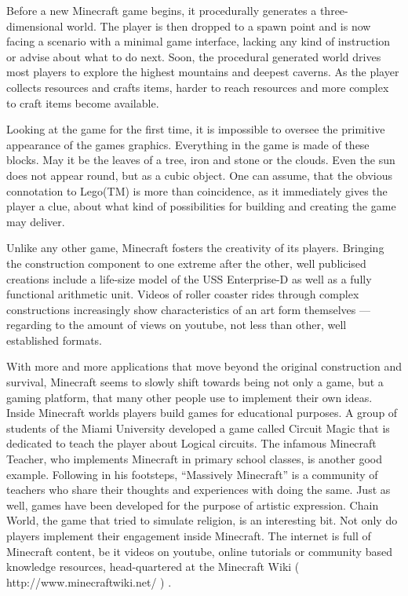 Before a new Minecraft game begins, it procedurally generates a three-dimensional world. The player is then dropped to a spawn point and is now facing a scenario with a minimal game interface, lacking any kind of instruction or advise about what to do next. Soon, the procedural generated world drives most players to explore the highest mountains and deepest caverns. As the player collects resources and crafts items, harder to reach resources and more complex to craft items  become available.~\cite{Duncan:2011:MBC:2207096.2207097}

Looking at the game for the first time, it is impossible to oversee the primitive appearance of the games graphics. Everything in the game is made of these blocks. May it be the leaves of a tree, iron and stone or the clouds. Even the sun does not appear round, but as a cubic object. One can assume, that the obvious connotation to Lego(TM) is more than coincidence, as it immediately gives the player a clue, about what kind of possibilities for building and creating the game may deliver.~\cite{Duncan:2011:MBC:2207096.2207097}

Unlike any other game, Minecraft fosters the creativity of its players. Bringing the construction component to one extreme after the other, well publicised creations include a life-size model of the USS Enterprise-D as well as a fully functional arithmetic unit. Videos of roller coaster rides through complex constructions increasingly show characteristics of an art form themselves --- regarding to the amount of views on youtube, not less than other, well established formats.~\cite{Duncan:2011:MBC:2207096.2207097}

With more and more applications that move beyond the original construction and survival, Minecraft seems to slowly shift towards being not only a game, but a gaming platform, that many other people use to implement their own ideas. Inside Minecraft worlds players build games for educational purposes. A group of students of the Miami University developed a game called Circuit Magic that is dedicated to teach the player about Logical circuits. The infamous Minecraft Teacher, who implements Minecraft in primary school classes, is another good example. Following in his footsteps, ``Massively Minecraft'' is a community of teachers who share their thoughts and experiences with doing the same. Just as well, games have been developed for the purpose of artistic expression. Chain World, the game that tried to simulate religion, is an interesting bit. Not only do players implement their engagement inside Minecraft. The internet is full of Minecraft content, be it videos on youtube, online tutorials or community based knowledge resources, head-quartered at the Minecraft Wiki ( http://www.minecraftwiki.net/ ) .~\cite{Duncan:2011:MBC:2207096.2207097}

